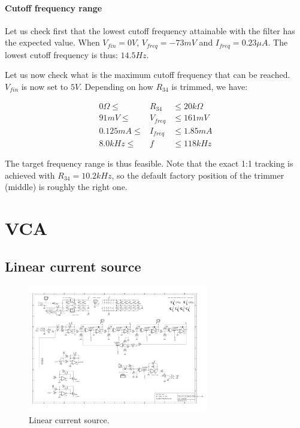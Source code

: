 \documentclass[a4paper,11pt]{article}
\begin{document}
\paragraph{Cutoff frequency range} Let us check first that the lowest cutoff frequency attainable with the filter has the expected value. When $V_{fin} = 0V$, $V_{freq} = -73mV$ and $I_{freq} = 0.23\mu A$. The lowest cutoff frequency is thus: $14.5 Hz$.

Let us now check what is the maximum cutoff frequency that can be reached. $V_{fin}$ is now set to $5V$. Depending on how $R_{34}$ is trimmed, we have:

\begin{eqnarray}
0 \Omega \leq &R_{34}& \leq 20 k\Omega \\
91mV \leq &V_{freq}& \leq 161mV \\
0.125 mA \leq &I_{freq}& \leq 1.85 mA \\
8.0kHz \leq &f& \leq 118kHz
\end{eqnarray}

The target frequency range is thus feasible. Note that the exact 1:1 tracking is achieved with $R_{34} = 10.2 kHz$, so the default factory position of the trimmer (middle) is roughly the right one.

\section{VCA}
\label{sec:vca}

\subsection{Linear current source}

\begin{figure}
\centering
\includegraphics[width=0.7\textwidth]{smr4mkII_linear_current_source.pdf}
\caption{Linear current source.}
\label{fig:linear}
\end{figure}
\end{document}
